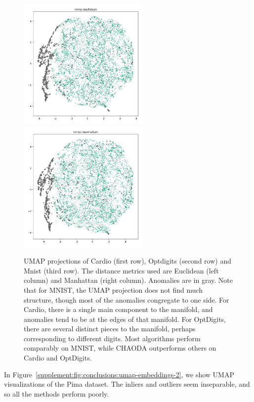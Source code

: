 \begin{figure}
   \includegraphics[width=2.5in]{images/umaps/mnist-euclidean-umap2d.png}
   \includegraphics[width=2.5in]{images/umaps/mnist-manhattan-umap2d.png}
   \caption{UMAP projections of Cardio (first row), Optdigits (second row) and Mnist (third row).
   The distance metrics used are Euclidean (left column) and Manhattan (right column).
   Anomalies are in gray.
   Note that for MNIST, the UMAP projection does not find much structure, though most of the anomalies congregate to one side.
   For Cardio, there is a single main component to the manifold, and anomalies tend to be at the edges of that manifold.
   For OptDigits, there are several distinct pieces to the manifold, perhaps corresponding to different digits.
   Most algorithms perform comparably on MNIST, while CHAODA outperforms others on Cardio and OptDigits.}
   \label{supplement:fig:conclusions:umap-embeddings-1}
\end{figure}

In Figure~\ref{supplement:fig:conclusions:umap-embeddings-2}, we show UMAP visualizations of the Pima dataset.
The inliers and outliers seem inseparable, and so all the methods perform poorly.

